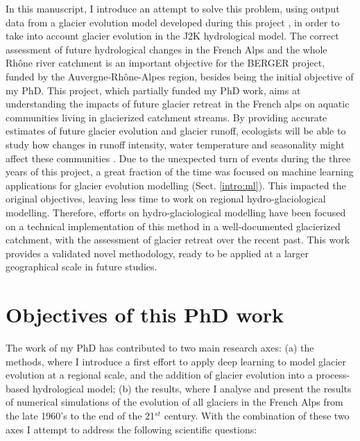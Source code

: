 In this manuscript, I introduce an attempt to solve this problem, using output data from a glacier evolution model developed during this project \citep{bolibar_alpgm_2020}, in order to take into account glacier evolution in the J2K hydrological model. The correct assessment of future hydrological changes in the French Alps and the whole Rhône river catchment is an important objective for the BERGER project, funded by the Auvergne-Rhône-Alpes region, besides being the initial objective of my PhD. This project, which partially funded my PhD work, aims at understanding the impacts of future glacier retreat in the French alps on aquatic communities living in glacierized catchment streams. By providing accurate estimates of future glacier evolution and glacier runoff, ecologists will be able to study how changes in runoff intensity, water temperature and seasonality might affect these communities \citep{robinson_ecosystem_2014, cauvy-fraunie_global_2019}. Due to the unexpected turn of events during the three years of this project, a great fraction of the time was focused on machine learning applications for glacier evolution modelling (Sect. \ref{intro:ml}). This impacted the original objectives, leaving less time to work on regional hydro-glaciological modelling. Therefore, efforts on hydro-glaciological modelling have been focused on a technical implementation of this method in a well-documented glacierized catchment, with the assessment of glacier retreat over the recent past. This work provides a validated novel methodology, ready to be applied at a larger geographical scale in future studies.

\section*{Objectives of this PhD work}

The work of my PhD has contributed to two main research axes: (a) the methods, where I introduce a first effort to apply deep learning to model glacier evolution at a regional scale, and the addition of glacier evolution into a process-based hydrological model; (b) the results, where I analyse and present the results of numerical simulations of the evolution of all glaciers in the French Alps from the late 1960's to the end of the 21$^{st}$ century. With the combination of these two axes I attempt to address the following scientific questions:
 
